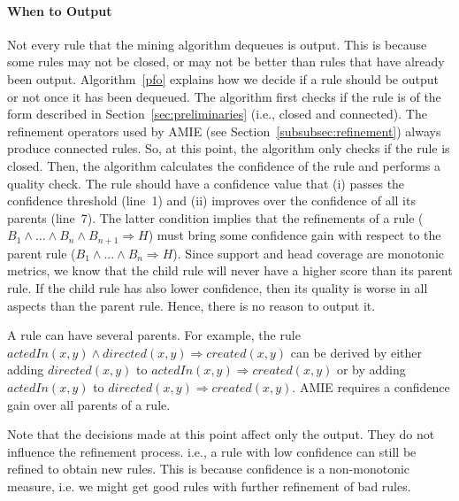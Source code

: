\paragraph{When to Output}\label{subsubsec:whenToOutput}
Not every rule that the mining algorithm dequeues is output. This is because some rules may not be closed, or may not be better than rules that have already been output. Algorithm~\ref{pfo} explains how we decide if a rule should be output or not once it has been dequeued.
The algorithm first checks if the rule is of the form described in Section~\ref{sec:preliminaries} (i.e., closed and connected).
The refinement operators used by AMIE (see Section~\ref{subsubsec:refinement}) always produce connected rules. 
So, at this point, the algorithm only checks if the rule is closed. Then, the algorithm calculates
the confidence of the rule and performs a quality check. The rule should have a confidence value that (i) passes the confidence threshold (line~1)
and (ii) improves over the confidence of all its parents (line~7).
The latter condition implies that the refinements of a rule ($B_1 \wedge ... \wedge B_n \wedge B_{n+1} \Rightarrow H$) must 
bring some confidence gain with respect to the parent rule
($B_1 \wedge ... \wedge B_n \Rightarrow H$). Since support and head coverage are monotonic metrics, 
we know that the child rule will never have a higher score than its parent rule. 
If the child rule has also lower confidence, then its quality is worse in all aspects than the parent rule. Hence, there is no reason to output it.

A rule can have several parents. For example, the rule $actedIn(x,y) \wedge directed(x,y) \Rightarrow created(x,y)$
can be derived by either adding $directed(x,y)$ to  $actedIn(x,y) \Rightarrow created(x,y)$ or by adding $actedIn(x,y)$ to
$directed(x,y) \Rightarrow created(x,y)$. AMIE requires a confidence gain over all parents of a rule.

Note that the decisions made at this point affect only the output. They do not influence the refinement process. i.e., a rule with low confidence can still be refined to obtain new rules.
This is because confidence is a non-monotonic measure, i.e. we might get good rules with further refinement of bad rules.


